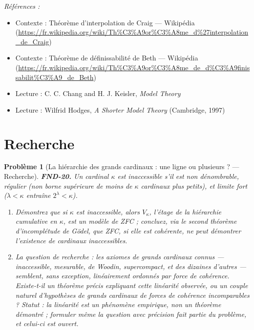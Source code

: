 \documentclass[11pt]{article}
\newtheorem{problem}{Problème}
\newenvironment{refs}{\par\small\noindent\emph{Références :}\begin{itemize}\setlength\itemsep{0pt}}{\end{itemize}\normalsize}
\begin{document}
\begin{refs}
\item Contexte : Théorème d'interpolation de Craig --- Wikipédia (\url{https://fr.wikipedia.org/wiki/Th%C3%A9or%C3%A8me_d%27interpolation_de_Craig})
\item Contexte : Théorème de définissabilité de Beth --- Wikipédia (\url{https://fr.wikipedia.org/wiki/Th%C3%A9or%C3%A8me_de_d%C3%A9finissabilit%C3%A9_de_Beth})
\item Lecture : C. C. Chang and H. J. Keisler, \textit{Model Theory}
\item Lecture : Wilfrid Hodges, \textit{A Shorter Model Theory} (Cambridge, 1997)
\end{refs}

\bigskip


\section*{Recherche}

\begin{problem}[{La hiérarchie des grands cardinaux : une ligne ou plusieurs ? --- Recherche}]
\textbf{FND-20.} Un cardinal $ \kappa $ est \textit{inaccessible} s'il est
non dénombrable, régulier (non borne supérieure de moins de $ \kappa $ cardinaux plus petits),
et limite fort ($ \lambda < \kappa $ entraîne $ 2^{\lambda} < \kappa $).
\begin{enumerate}
\item[(a)] Démontrez
que si $ \kappa $ est inaccessible, alors $ V_{\kappa} $, l'étage de la hiérarchie cumulative
en $ \kappa $, est un modèle de ZFC ; concluez, via le second théorème d'incomplétude de Gödel,
que ZFC, si elle est cohérente, ne peut démontrer l'existence de cardinaux inaccessibles.
\item[(b)] La question
de recherche : les axiomes de grands cardinaux connus --- inaccessible, mesurable, de Woodin,
supercompact, et des dizaines d'autres --- semblent, sans exception, linéairement ordonnés par force
de cohérence. Existe-t-il un théorème précis expliquant cette linéarité observée, ou un couple
naturel d'hypothèses de grands cardinaux de forces de cohérence incomparables ?
\textit{Statut : la linéarité est un phénomène empirique, non un théorème démontré ; formuler même la
question avec précision fait partie du problème, et celui-ci est ouvert.}
\end{enumerate}

\end{problem}
\end{document}
